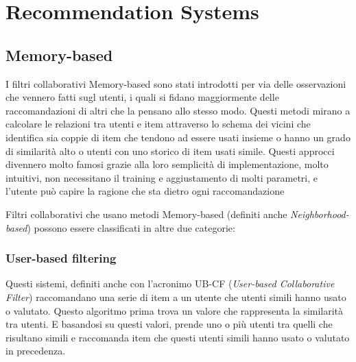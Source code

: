 \chapter{Recommendation Systems}









\section{Memory-based} \hfill \break
I filtri collaborativi Memory-based sono stati introdotti per via delle osservazioni che vennero fatti sugl utenti, i quali si fidano
maggiormente delle raccomandazioni di altri che la pensano allo stesso modo. Questi metodi mirano a calcolare le relazioni tra utenti
e item attraverso lo schema dei vicini che identifica sia coppie di item che tendono ad essere usati insieme o hanno un grado di 
similarità alto o utenti con uno storico di item usati simile. \cite{taxonomy-of-recommender-agents-on-the-internet}
Questi approcci divennero molto famosi grazie alla loro semplicità di implementazione, molto intuitivi, non necessitano il training e
aggiustamento di molti parametri, e l'utente può capire la ragione che sta dietro ogni raccomandazione 

Filtri collaborativi che usano metodi Memory-based (definiti anche \textit{Neighborhood-based}) possono essere classificati in altre due
categorie:


\subsection{User-based filtering} \hfill \break
Questi sistemi, definiti anche con l'acronimo UB-CF (\textit{User-based Collaborative Filter}) raccomandano una serie di item a 
un utente che utenti simili hanno usato o valutato. Questo algoritmo prima trova un valore che rappresenta la similarità tra utenti. 
E basandosi su questi valori, prende uno o più utenti tra quelli che risultano simili e raccomanda item che questi utenti simili 
hanno usato o valutato in precedenza.


